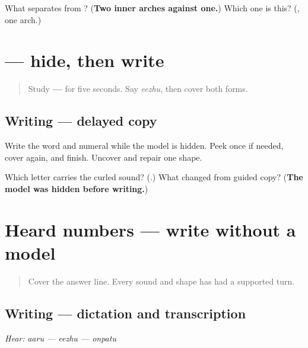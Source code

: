 \begin{tcolorbox}[breakable,colback=teal!4,colframe=teal!35!black,title={Before you move on}]
What separates  from ? (\textbf{Two inner arches against one.}) Which one is this? (\textbf{}, one arch.)
\end{tcolorbox}
\section[\texorpdfstring{\ta{ஏழு} \ta{௭} (eezhu, seven)}{ஏழு ௭ (eezhu, seven)}]{ — hide, then write}

\label{lesson:TA-W07-numbers-6-10-delayed-copy}



\begin{quote}
Study \textbf{ — } for five seconds. Say \emph{eezhu}, then cover both forms.
\end{quote}

\subsection*{Writing — delayed copy}
Write the word and numeral while the model is hidden. Peek once if needed, cover again, and finish. Uncover and repair one shape.

\begin{tcolorbox}[breakable,colback=teal!4,colframe=teal!35!black,title={Before you move on}]
Which letter carries the curled sound? (\textbf{}.) What changed from guided copy? (\textbf{The model was hidden before writing.})
\end{tcolorbox}
\section[\texorpdfstring{\ta{ஏழு} \ta{௭} (eezhu, seven)}{ஏழு ௭ (eezhu, seven)}]{Heard numbers — write without a model}

\label{lesson:TA-W07-numbers-6-10-dictation}



\begin{quote}
Cover the answer line. Every sound and shape has had a supported turn.
\end{quote}

\subsection*{Writing — dictation and transcription}
\emph{Hear:} \emph{aaru — eezhu — onpatu}

